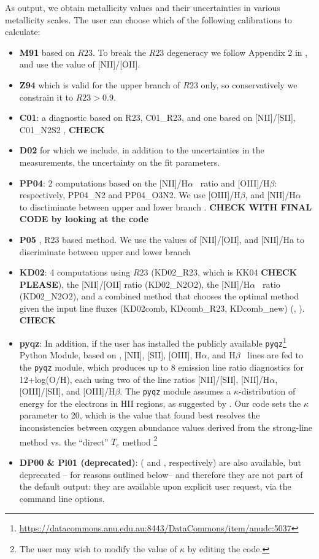 \documentclass{emulateapj}
\newcommand{\ha}{H$\alpha$}
\newcommand{\hb}{H$\beta$}
\begin{document}
As output, we obtain metallicity values and their uncertainties in various metallicity scales. The user can choose which of the following calibrations to calculate: 
\begin{itemize}
\item {\bf M91} \citep{mcgaugh91} based on $R23$. To break the $R23$ degeneracy we follow Appendix 2 in \citet{kewley08}, and use the value of [NII]/[OII].
\item {\bf Z94} \citep{zaritsky94} which is valid for the upper branch of $R23$ only, so conservatively we constrain it to $R23>0.9$.
\item {\bf C01}: a diagnostic based on R23, C01\_R23, and one based on [NII]/[SII], C01\_N2S2  \citep{charlot01}, \textbf{CHECK}%
\item {\bf D02} \citep{denicolo02} for which we include, in addition to the uncertainties in the measurements, the uncertainty on the fit parameters.
\item {\bf PP04}:  \citep{pettini04} 2 computations based on the [NII]/\ha~ ratio and [OIII]/\hb: respectively, PP04\_N2 and PP04\_O3N2.  We use [OIII]/\hb, and  [NII]/\ha~ to disctiminate between upper and lower branch \citep{kewley08}. \textbf{CHECK WITH FINAL CODE  by looking at the code}
\item {\bf P05} \citep{pilyugin05}, R23 based method. We use the values of [NII]/[OII], and  [NII]/Ha to discriminate between upper and lower branch 
\item {\bf KD02}: 4 computations using $R23$ (KD02\_R23, which is KK04 \textbf{CHECK PLEASE}), the [NII]/[OII] ratio (KD02\_N2O2), the [NII]/\ha~ ratio (KD02\_N2O2), and a combined method that chooses the optimal method given the input line fluxes (KD02comb, KDcomb\_R23, KDcomb\_new) (\citealt{kewley02}, \citealt{kewley08}). \textbf{CHECK}

\item {\bf pyqz}: In addition, if the user has installed the publicly available \verb=pyqz=\footnote{\url{https://datacommons.anu.edu.au:8443/DataCommons/item/anudc:5037}} Python Module, based on \citet{dopita13}, [NII], [SII], [OIII], \ha, and \hb~ lines are fed to the \verb=pyqz= module, which produces up to 8 emission line ratio diagnostics for  12+log(O/H), each using two of the line ratios [NII]/[SII], [NII]/\ha, [OIII]/[SII], and [OIII]/\hb. The \verb=pyqz= module assumes a $\kappa$-distribution of energy for the electrons in HII regions, as suggested by \citet{nicholls12}. Our code sets the $\kappa$ parameter to 20, which is the value that \citet{dopita13} found best resolves the inconsistencies between oxygen abundance values derived from the strong-line method vs. the ``direct'' $T_e$ method \footnote{The user may wish to modify the value of $\kappa$ by editing the code.}
\item{\bf DP00 \& Pi01 (deprecated)}: (\citealt{diaz00} and \citealt{pilyugin01}, respectively) are also available, but deprecated -- for reasons outlined below--  and therefore they are not part of the default output: they are available upon explicit user request, via the command line options. 
\end{itemize}
\end{document}
